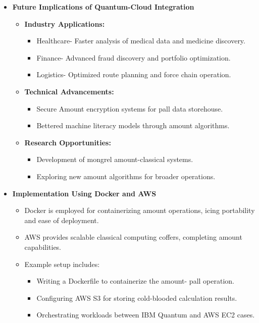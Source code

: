 \documentclass[conference]{IEEEtran}
\begin{document}
\begin{itemize}
    \item \textbf{Future Implications of Quantum-Cloud Integration}
    \begin{itemize}
        \item \textbf{Industry Applications:}
        \begin{itemize}
            \item Healthcare- Faster analysis of medical data and medicine discovery.
             \item  Finance- Advanced fraud discovery and portfolio optimization.
             \item Logistics- Optimized route planning and force chain operation.
        \end{itemize}
        \item \textbf{Technical Advancements:}
        \begin{itemize}
            \item Secure Amount encryption systems for pall data storehouse.
             \item Bettered machine literacy models through amount algorithms.
        \end{itemize}
        \item \textbf{Research Opportunities:}
        \begin{itemize}
            \item Development of mongrel amount-classical systems.
            \item Exploring new amount algorithms for broader operations.
        \end{itemize}
    \end{itemize}

    \item \textbf{Implementation Using Docker and AWS}
    \begin{itemize}
        \item Docker is employed for containerizing amount operations, icing portability and ease of deployment.
         \item AWS provides scalable classical computing coffers, completing amount capabilities.
        \item Example setup includes:
        \begin{itemize}
            \item Writing a{ Dockerfile} to containerize the amount- pall operation.
             \item Configuring AWS S3 for storing cold-blooded calculation results.
             \item Orchestrating workloads between IBM Quantum and AWS EC2 cases.
        \end{itemize}
    \end{itemize}

\end{itemize}
\end{document}
